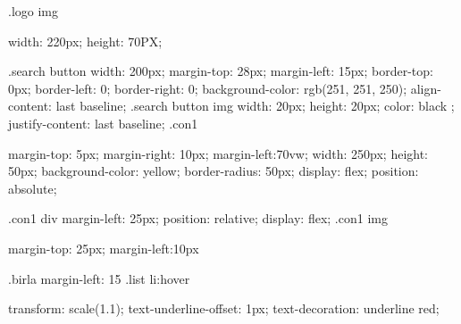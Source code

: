                                         
                                        .logo img{
                                            width: 220px;
                                            height: 70PX;
                                            
                                        
                                        }
                                        .search button{
                                            width: 200px;
                                            margin-top: 28px;
                                            margin-left: 15px;
                                            border-top: 0px;
                                            border-left: 0;
                                            border-right: 0;
                                            background-color: rgb(251, 251, 250);
                                            align-content: last baseline;
                                        }
                                        .search button img{
                                            width: 20px;
                                            height: 20px;
                                            color: black ;
                                            justify-content: last baseline;
                                        }
                                        .con1{
                                            margin-top: 5px;
                                            margin-right: 10px;
                                            margin-left:70vw;
                                            width: 250px;
                                            height: 50px;
                                            background-color: yellow;
                                            border-radius: 50px;
                                            display: flex;
                                            position: absolute;
                                            
                                        }
                                        .con1 div{
                                            margin-left: 25px;
                                            position: relative;
                                            display: flex;
                                        }
                                        .con1 img {
                                            margin-top: 25px;
                                            margin-left:10px
                                        
                                        }
                                        .birla{
                                            margin-left: 15%
                                        }
                                        .list li:hover{
                                            transform: scale(1.1);
                                            text-underline-offset: 1px;
                                            text-decoration: underline red;
                                        
                                        }
                                        
